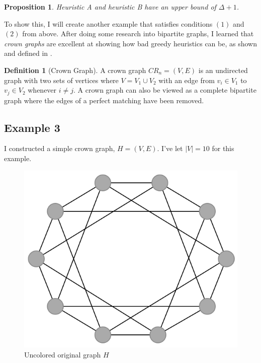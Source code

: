 \documentclass{article}
\newtheorem{prop}{Proposition}
\theoremstyle{definition}
\newtheorem*{definition}{Definition}
\begin{document}
\begin{prop}
Heuristic A and heuristic B have an upper bound of \(\Delta + 1\).
\end{prop}

To show this, I will create another example that satisfies conditions \((1)\) and \((2)\) from above. After doing some research into bipartite graphs, I learned that \emph{crown graphs} are excellent at showing how bad greedy heuristics can be, as shown and defined in \cite{kordecki}.

\begin{definition}[Crown Graph]
A crown graph \(CR_n = (V, E)\) is an undirected graph with two sets of vertices where \(V = V_1 \cup V_2\) with an edge from \(v_i \in V_1\) to \(v_{j} \in V_2\) whenever \(i \neq j\). A crown graph can also be viewed as a complete bipartite graph where the edges of a perfect matching have been removed.
\end{definition}

\subsection*{Example 3}

I constructed a simple crown graph, \(H = (V, E)\). I've let \(|V| = 10\) for this example.

\begin{figure}[H]
\centering
\includegraphics[scale=0.38]{images/graph-4.png}
\caption{Uncolored original graph \(H\)}
\end{figure}
\end{document}
